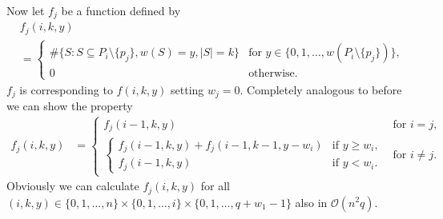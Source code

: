 \documentclass[review]{elsarticle}
\theoremstyle{defn}
\theoremstyle{Pseudo-Code}
\begin{document}
Now let $f_j$ be a function defined by
\begin{align*}
  &f_j(i,k,y)
\\  
  &=
  \begin{cases}
  \#\{
    S:S\subseteq P_{i}\setminus\{ p_j\}, w(S)=y, |S|=k  
  \}
  & \text{for } y\in \{0,1,\dots,w(P_{i}\setminus\{ p_j\})\}, \\
  0 & \text{otherwise.}
  \end{cases}
\end{align*} 
$f_j$ is corresponding to $f(i,k,y)$ setting $w_j=0$.
Completely analogous to before we can show the property
\begin{align*}
  f_j(i,k,y)
  &=
  \begin{cases}
    f_j(i-1,k,y) & \text{for } i=j, \\
    \begin{cases}
    f_j(i-1,k,y) + f_j(i-1,k-1,y-w_i) & \text{if }  y\geq w_i, \\
    f_j(i-1,k,y)                    & \text{if }  y<w_i.
    \end{cases}
    & \text{for }  i\neq j.
  \end{cases}
\end{align*}
Obviously we can calculate $f_j(i,k,y)$ for all $(i,k,y)\in \{0,1,\dots,n\}\times\{0,1,\dots,i\}\times\{0,1,\dots,q+w_1-1\}$ also in $\mathcal{O}(n^2q)$. 
\end{document}
